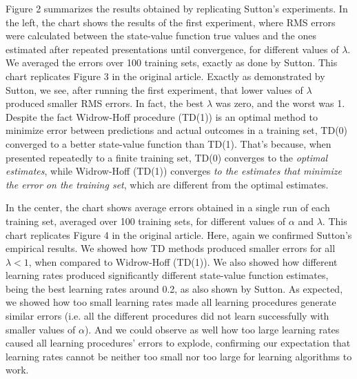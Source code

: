 \documentclass{article}
\begin{document}
Figure 2 summarizes the results obtained by replicating Sutton's experiments.
In the left, the chart shows the results of the first experiment, where RMS errors were calculated between the state-value function true values and the ones estimated after repeated presentations until convergence, for different values of $\lambda$.
We averaged the errors over 100 training sets, exactly as done by Sutton.
This chart replicates Figure 3 in the original article.
Exactly as demonstrated by Sutton, we see, after running the first experiment, that lower values of $\lambda$ produced smaller RMS errors.
In fact, the best $\lambda$ was zero, and the worst was 1.
Despite the fact Widrow-Hoff procedure (TD(1)) is an optimal method to minimize error between predictions and actual outcomes in a training set, TD(0) converged to a better state-value function than TD(1).
That's because, when presented repeatedly to a finite training set, TD(0) converges to the \emph{optimal estimates}, while Widrow-Hoff (TD(1)) converges \emph{to the estimates that minimize the error on the training set}, which are different from the optimal estimates.

In the center, the chart shows average errors obtained in a single run of each training set, averaged over 100 training sets, for different values of $\alpha$ and $\lambda$.
This chart replicates Figure 4 in the original article.
Here, again we confirmed Sutton's empirical results.
We showed how TD methods produced smaller errors for all $\lambda < 1$, when compared to Widrow-Hoff (TD(1)).
We also showed how different learning rates produced significantly different state-value function estimates, being the best learning rates around 0.2, as also shown by Sutton.
As expected, we showed how too small learning rates made all learning procedures generate similar errors (i.e. all the different procedures did not learn successfully with smaller values of $\alpha$).
And we could observe as well how too large learning rates caused all learning procedures' errors to explode, confirming our expectation that learning rates cannot be neither too small nor too large for learning algorithms to work.
\end{document}

